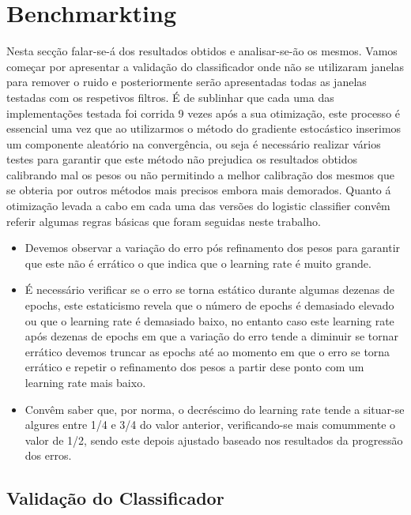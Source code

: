 \section{Benchmarkting}

Nesta secção falar-se-á dos resultados obtidos e analisar-se-ão os mesmos. Vamos começar por apresentar a validação do classificador onde não se utilizaram janelas para remover o ruido e posteriormente serão apresentadas todas as janelas testadas com os respetivos filtros.\newline
É de sublinhar que cada uma das implementações testada foi corrida 9 vezes após a sua otimização, este processo é essencial uma vez que ao utilizarmos o método do gradiente estocástico inserimos um componente aleatório na convergência, ou seja é necessário realizar vários testes para garantir que este método não prejudica os resultados obtidos calibrando mal os pesos ou não permitindo a melhor calibração dos mesmos que se obteria por outros métodos mais precisos embora mais demorados.
Quanto á otimização levada a cabo em cada uma das versões do logistic classifier convêm referir algumas regras básicas que foram seguidas neste trabalho.
\begin{itemize}

	\item Devemos observar a variação do erro pós refinamento dos pesos para garantir que este não é errático o que indica que o learning rate é muito grande\cite{ref4}.
	\item É necessário verificar se o erro se torna estático durante algumas dezenas de epochs, este estaticismo revela que o número de epochs é demasiado elevado ou que o learning rate é demasiado baixo, no entanto caso este learning rate após dezenas de epochs em que a variação do erro tende a diminuir se tornar errático devemos truncar as epochs  até ao momento em que o erro se torna errático e repetir o refinamento dos pesos a partir dese ponto com um learning rate mais baixo\cite{ref4}.\hfill\newline
	\item Convêm saber que, por norma, o decréscimo do learning rate tende a situar-se algures entre 1/4 e 3/4 do valor anterior, verificando-se mais comummente o valor de 1/2, sendo este depois ajustado baseado nos resultados da progressão dos erros\cite{ref7}.
\end{itemize}


\subsection{Validação do Classificador}

